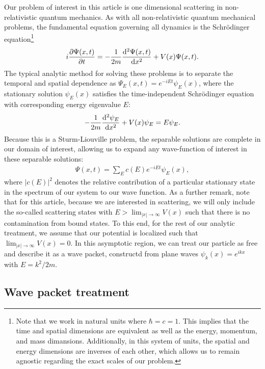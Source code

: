 Our problem of interest in this article is one dimensional scattering in non-relativistic quantum mechanics.
As with all non-relativistic quantum mechanical problems, the fundamental equation governing all dynamics is the Schr\"{o}dinger equation\footnote{Note that we work in natural units where $\hbar = c = 1$. This implies that the time and spatial dimensions are equivalent as well as the energy, momentum, and mass dimansions. Additionally, in this system of units, the spatial and energy dimensions are inverses of each other, which allows us to remain agnostic regarding the exact scales of our problem.}
\begin{align}
\label{eq:td-S-eq}
    i \pdv{\Psi(x,t)}{t} = -\frac{1}{2m} \dv[2]{\Psi(x,t)}{x} + V(x) \Psi(x,t)
.\end{align}
The typical analytic method for solving these problems is to separate the temporal and spatial dependence as $\Psi_{E}(x,t) = e^{- i E t} \psi_{E}(x)$, where the stationary solution $\psi_{E}(x)$ satisfies the time-independent Schr\"{o}dinger equation with corresponding energy eigenvalue $E$:
\begin{align}
\label{eq:ti-S-eq}
    -\frac{1}{2m} \dv[2]{\psi_{E}}{x} + V(x) \psi_{E} = E \psi_{E}
.\end{align}
Because this is a Sturm-Liouville problem, the separable solutions are complete in our domain of interest, allowing us to expand any wave-function of interest in these separable solutions:
\begin{align}
\label{eq:psi-expansion}
    \Psi(x,t) = \sum_{E} c(E) e^{-i E t} \psi_{E}(x)
,\end{align}
where $|c(E)|^2$ denotes the relative contribution of a particular stationary state in the spectrum of our system to our wave function.
As a further remark, note that for this article, because we are interested in scattering, we will only include the so-called scattering states with $E > \lim_{|x| \rightarrow \infty} V(x)$ such that there is no contamination from bound states.
To this end, for the rest of our analytic treatment, we assume that our potential is localized such that $\lim_{|x| \rightarrow \infty} V(x) = 0$.
In this asymptotic region, we can treat our particle as free and describe it as a wave packet, constructd from plane waves $\psi_{k}(x) = e^{i k x}$ with $E = k^2 / 2m$.

\subsection{Wave packet treatment}
\label{ssec:wave-packet-treatment}

